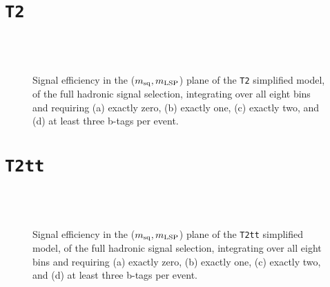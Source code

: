 \newpage
\section{\texttt{T2}\label{app:sig-eff-t2}}

\begin{figure}[h!]
  \begin{center}
     \\
     \\
    \caption{\label{fig:sig-eff-t2}Signal efficiency in the ($m_{\rm
        sq},m_{\rm LSP}$) plane of the \texttt{T2} simplified model,
      of the full hadronic signal selection, integrating over all
      eight \HT bins and requiring (a) exactly zero, (b) exactly
      one, (c) exactly two, and (d) at least three b-tags per event.}
  \end{center}
\end{figure}

\newpage
\section{\texttt{T2tt}\label{app:sig-eff-t2tt}}

\begin{figure}[h!]
  \begin{center}
     \\
     \\
    \caption{\label{fig:sig-eff-t2tt}Signal efficiency in the ($m_{\rm
        sq},m_{\rm LSP}$) plane of the \texttt{T2tt} simplified model,
      of the full hadronic signal selection, integrating over all
      eight \HT bins and requiring (a) exactly zero, (b) exactly
      one, (c) exactly two, and (d) at least three b-tags per event.}
  \end{center}
\end{figure}

